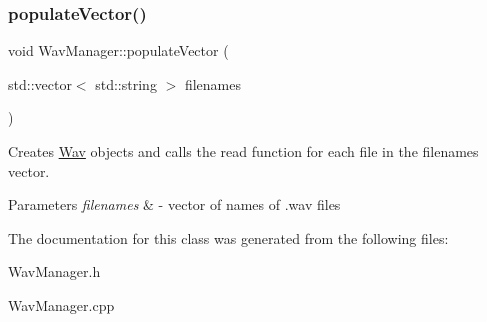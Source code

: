 \subsubsection{\texorpdfstring{populate\+Vector()}{populateVector()}}
{\footnotesize\ttfamily void Wav\+Manager\+::populate\+Vector (\begin{DoxyParamCaption}\item[{std\+::vector$<$ std\+::string $>$}]{filenames }\end{DoxyParamCaption})}



Creates \hyperlink{classWav}{Wav} objects and calls the read function for each file in the filenames vector. 


\begin{DoxyParams}{Parameters}
{\em filenames} & -\/ vector of names of .wav files \\
\hline
\end{DoxyParams}


The documentation for this class was generated from the following files\+:\begin{DoxyCompactItemize}
\item 
Wav\+Manager.\+h\item 
Wav\+Manager.\+cpp\end{DoxyCompactItemize}
